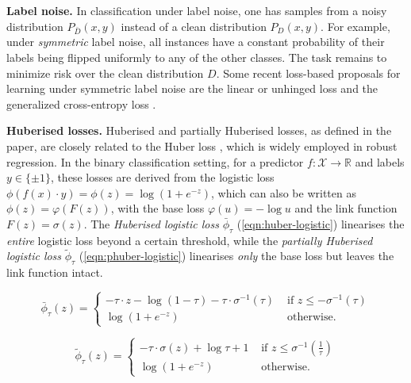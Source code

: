 \textbf{Label noise.} In classification under label noise, one has samples from a noisy distribution $P_{\bar{D}}(x,y)$ instead of a clean distribution $P_{D}(x,y)$. For example, under \emph{symmetric} label noise, all instances have a constant probability of their labels being flipped uniformly to any of the other classes. 
The task remains to minimize risk over the clean distribution $D$.
Some recent loss-based proposals for learning under symmetric label noise are the linear or unhinged loss \parencite{van_rooyen_learning_2015} and the generalized cross-entropy loss \parencite{zhang_generalized_2018}.

\textbf{Huberised losses.} Huberised and partially Huberised losses, as defined in the paper, are closely related to the Huber loss \parencite{huber_robust_1964}, which is widely employed in robust regression. In the binary classification setting, for a predictor $f : \mathcal{X} \rightarrow \mathbb{R}$ and labels $y \in \{\pm1\}$, these losses are derived from the logistic loss $ \phi(f(x) \cdot y) = \phi(z)=\log(1 + e^{-z})$, which can also be written as $\phi(z)=\varphi(F(z))$, with the base loss $\varphi(u)=-\log u$ and the link function $F(z)=\sigma(z)$. The \emph{Huberised logistic loss} $\bar{\phi}_{\tau}$ (\autoref{eqn:huber-logistic}) linearises the \emph{entire} logistic loss beyond a certain threshold, while the \emph{partially Huberised logistic loss} $\tilde{\phi}_{\tau}$ (\autoref{eqn:phuber-logistic}) linearises \emph{only} the base loss but leaves the link function intact.

\begin{equation}
\label{eqn:huber-logistic}
\bar{\phi}_{\tau}(z)=\left\{\begin{array}{ll}
-\tau \cdot z-\log (1-\tau)-\tau \cdot \sigma^{-1}(\tau) & \text { if } z \leq-\sigma^{-1}(\tau) \\
\log \left(1+e^{-z}\right) & \text { otherwise. }
\end{array}\right.
\end{equation}

\begin{equation}
\label{eqn:phuber-logistic}
\tilde{\phi}_{\tau}(z)=\left\{\begin{array}{ll}
-\tau \cdot \sigma(z)+\log \tau+1 & \text { if } z \leq \sigma^{-1}\left(\frac{1}{\tau}\right) \\
\log \left(1+e^{-z}\right) & \text { otherwise. }
\end{array}\right.
\end{equation}

